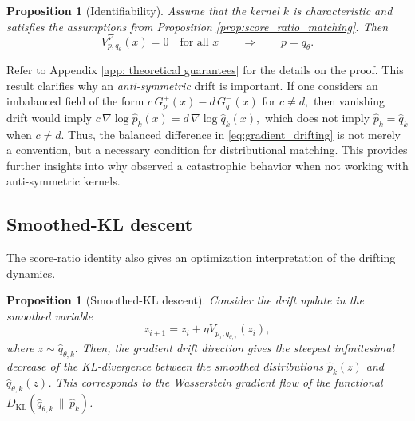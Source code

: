 \documentclass{article}
\theoremstyle{plain}
\newtheorem{proposition}[theorem]{Proposition}
\begin{document}
\begin{tcolorbox}[
    colback=blue!5,
    colframe=blue!5,
    boxrule=0pt,
    arc=2mm,
    left=2mm,
    right=2mm,
    top=2mm,
    bottom=2mm
]
\begin{proposition}[Identifiability]
\label{prop:identifiability}
Assume that the kernel \(k\) is characteristic and satisfies the assumptions from Proposition \ref{prop:score_ratio_matching}. Then
\[
V^\nabla_{p,q_\theta}(x)=0
\quad \text{for all } x \qquad
\Longrightarrow
\qquad p=q_\theta.\]
\end{proposition}
\end{tcolorbox}
Refer to Appendix \ref{app: theoretical guarantees} for the details on the proof. This result clarifies why an \textit{anti-symmetric} drift  is
important. If one considers an imbalanced field of the form $c\,G_{p}^+(x)-d\,G_{q}^-(x)$ for $ c\neq d,$  then vanishing drift would imply $ c\,\nabla \log \widehat{p}_k(x) = d\,\nabla \log \widehat{q}_k(x),$
which does not imply $\widehat{p}_k = \widehat{q}_k$ when $c\neq d$. Thus, the balanced
difference in \eqref{eq:gradient_drifting} is not merely a convention, but a necessary condition for distributional matching. This provides further insights into why \citet{Deng_2026_Drift} observed a catastrophic behavior when not working with anti-symmetric kernels. 

\subsection{Smoothed-KL descent}
The score-ratio identity also gives an optimization interpretation of the drifting dynamics. 
\begin{tcolorbox}[
    colback=blue!5,
    colframe=blue!5,
    boxrule=0pt,
    arc=2mm,
    left=2mm,
    right=2mm,
    top=2mm,
    bottom=2mm
]
\begin{proposition}[Smoothed-KL descent]
\label{prop:smoothed_kl_descent} Consider the drift update in the \textit{smoothed} variable \[z_{i+1}=z_i + \eta V_{p_\tau,q_{\theta,\tau}}(z_i),\] where  $z\sim \hat q_{\theta,k}.$  Then, the gradient drift direction gives the steepest infinitesimal decrease of the KL-divergence between the smoothed distributions $\hat p_k (z)$ and $\hat q_{\theta,k} (z)$. This corresponds to the Wasserstein gradient flow of the functional $D_{\mathrm{KL}}(\hat q_{\theta,k} \,\|\, \hat p_k)$.   \end{proposition}
\end{tcolorbox}
\end{document}
